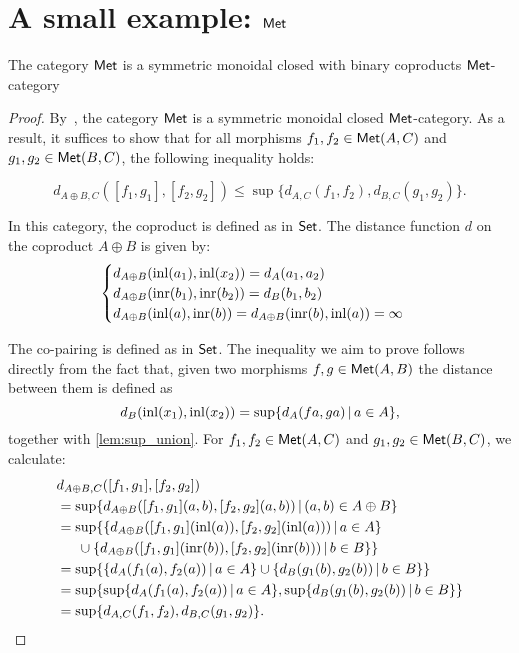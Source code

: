 \section{A small example: $\mathsf{Met}$}

\begin{proposition}
        \label{prop:vcat}
        The category $\mathsf{Met}$ is a symmetric monoidal closed with binary coproducts $\mathsf{Met}$-category 
\end{proposition}

\begin{proof}
  By~\cite[Example 3.8]{dahlqvist2023syntactic}, the category $\mathsf{Met}$ is a symmetric monoidal closed $\mathsf{Met}$-category. As a result, it suffices to show that for all morphisms \( f_1, f_2 \in \mathsf{Met}(A, C) \) and \( g_1, g_2 \in \mathsf{Met}(B, C) \), the following inequality holds:
  
\[
  d_{A \oplus B, C}([f_1, g_1], [f_2, g_2]) \leq \sup \{d_{A,C}(f_1, f_2), d_{B,C}(g_1, g_2)\}.
\]

In this category, the coproduct is defined as in $\mathsf{Set}$. The distance function $d$ on the coproduct $A \oplus B$ is given by:
   \[
    \begin{cases}
    d_{A \oplus B}(\mathrm{inl}(a_1),\mathrm{inl}(x_2)) = d_A(a_1,a_2) \\
    d_{A \oplus B}(\mathrm{inr}(b_1),\mathrm{inr}(b_2)) = d_B(b_1,b_2) \\
    d_{A \oplus B}(\mathrm{inl}(a), \mathrm{inr}(b)) = 
    d_{A \oplus B}(\mathrm{inr}(b), \mathrm{inl}(a))  = \infty
    \end{cases}
    \]

    The co-pairing is defined as in $\mathsf{Set}$. The inequality we aim to prove follows directly from the fact that, given two morphisms  $f,g\in \mathsf{Met}(A, B)$ the distance between them is defined as 
  $$ d_{B}(\mathrm{inl}(x_1),\mathrm{inl}(x_2)) = \sup \{ d_A (f a, g a) \,\vert \, a \in A \} ,$$  
    together with \autoref{lem:sup_union}. For  \( f_1, f_2 \in \mathsf{Met}(A, C) \) and \( g_1, g_2 \in \mathsf{Met}(B, C) \), we calculate:
    \begin{align*}
      & d_{A \oplus B, C}([f_1, g_1], [f_2, g_2]) \\
      &  =  \sup \{ d_{A\oplus B} ([f_1, g_1] (a,b), [f_2, g_2] (a,b)) \,\vert \, (a,b) \in A \oplus B \} \\
      & =  \sup \{ \{ d_{A\oplus B} ([f_1, g_1] (\mathrm{inl}(a)), [f_2, g_2] (\mathrm{inl}(a))) \,\vert \, a \in A \}    \\
      & \hspace{15pt} \cup \{d_{A\oplus B} ([f_1, g_1] (\mathrm{inr}(b)), [f_2, g_2] (\mathrm{inr}(b))) \,\vert \, b \in B\}\} \\
      & = \sup \{ \{ d_{A}(f_1 (a), f_2 (a)) \,\vert \, a \in A \} \cup  \{d_{B}(g_1 (b), g_2 (b)) \,\vert \, b \in B \}\} \\
      & = \sup   \{ \sup \{ d_{A}(f_1 (a), f_2 (a)) \,\vert \, a \in A \}, \sup\{d_{B}(g_1 (b), g_2 (b)) \,\vert \, b \in B \}\} \\
      &=  \sup \{d_{A,C}(f_1, f_2), d_{B,C}(g_1, g_2)\}. 
    \end{align*}
\end{proof}





